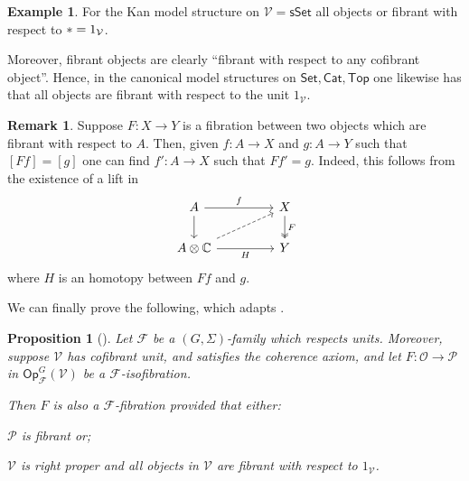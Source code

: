 \documentclass[a4paper,10pt
,draft
]{article}%
\numberwithin{equation}{section}
\numberwithin{figure}{section}
\newtheorem{proposition}[equation]{Proposition}%
\theoremstyle{definition} %
\newtheorem{example}[equation]{Example}%
\newtheorem{remark}[equation]{Remark}%
\newcommand{\Op}{\mathsf{Op}}%
\newcommand{\F}{\ensuremath{\mathcal F}}
\newcommand{\V}{\ensuremath{\mathcal V}}
\renewcommand{\O}{\ensuremath{\mathcal O}}
\renewcommand{\P}{\ensuremath{\mathcal P}}
\newcommand{\1}{\ensuremath{\mathbbm 1}}%
\begin{document}
\begin{example}
For the Kan model structure on $\V=\mathsf{sSet}$
all objects or fibrant with respect to $\** = 1_{\V}$.

Moreover, fibrant objects are clearly ``fibrant with respect to any cofibrant object''.
Hence, in the canonical model structures on 
$\mathsf{Set}, \mathsf{Cat}, \mathsf{Top}$
one likewise has that all objects are fibrant with respect to the unit
$1_{\V}$.
\end{example}


\begin{remark}\label{RELFIBLIFT REM}
Suppose $F\colon X \to Y$ is a fibration between two objects
which are fibrant with respect to $A$.
Then, given 
$f\colon A \to X$ and $g \colon A \to Y$
such that
$[Ff] = [g]$
one can find 
$f'\colon A \to X$ such that $Ff' =g$.
Indeed, this follows from the existence of a 
lift in 
\begin{equation}
\begin{tikzcd}[column sep = 45pt]
	A \ar{d} \ar{r}{f}
&
	X \ar[twoheadrightarrow]{d}{F}
\\
	A \otimes \mathbb{C} \ar{r}[swap]{H} \ar[dashed]{ru}
&
	Y
\end{tikzcd}
\end{equation}
where $H$ is an homotopy between $Ff$ and $g$.
\end{remark}




We can finally prove the following, which adapts
\cite[Props. 2.5]{Ber07b}.

\begin{proposition}[{\cite[Prop. 2.5]{Ber07b}}]
\label{ISOFIBHARD PROP}
Let $\F$ be a $(G,\Sigma)$-family which respects units.
Moreover, suppose $\V$ has cofibrant unit,
and satisfies the coherence axiom,
and let $F: \O \to \P$ in $\Op^G_\F(\V)$
be a $\F$-isofibration.

Then $F$ is also a $\F$-fibration
provided that either:
\begin{enumerate*}[label = (\roman*)]
\item $\P$ is fibrant or;
\item $\V$ is right proper and
all objects in $\V$ are fibrant with respect to $1_{\V}$.
\end{enumerate*}
\end{proposition}
\end{document}
